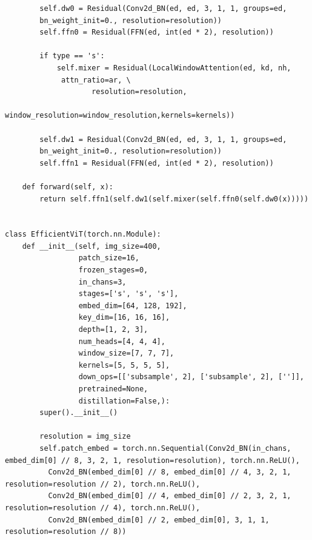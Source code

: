 \documentclass[12pt]{ctexart}
\begin{document}
\begin{lstlisting}
        self.dw0 = Residual(Conv2d_BN(ed, ed, 3, 1, 1, groups=ed, 
        bn_weight_init=0., resolution=resolution))
        self.ffn0 = Residual(FFN(ed, int(ed * 2), resolution))
 
        if type == 's':
            self.mixer = Residual(LocalWindowAttention(ed, kd, nh,
             attn_ratio=ar, \
                    resolution=resolution,
                    window_resolution=window_resolution,kernels=kernels))
                
        self.dw1 = Residual(Conv2d_BN(ed, ed, 3, 1, 1, groups=ed, 
        bn_weight_init=0., resolution=resolution))
        self.ffn1 = Residual(FFN(ed, int(ed * 2), resolution))
 
    def forward(self, x):
        return self.ffn1(self.dw1(self.mixer(self.ffn0(self.dw0(x)))))
 
 
class EfficientViT(torch.nn.Module):
    def __init__(self, img_size=400,
                 patch_size=16,
                 frozen_stages=0,
                 in_chans=3,
                 stages=['s', 's', 's'],
                 embed_dim=[64, 128, 192],
                 key_dim=[16, 16, 16],
                 depth=[1, 2, 3],
                 num_heads=[4, 4, 4],
                 window_size=[7, 7, 7],
                 kernels=[5, 5, 5, 5],
                 down_ops=[['subsample', 2], ['subsample', 2], ['']],
                 pretrained=None,
                 distillation=False,):
        super().__init__()
 
        resolution = img_size
        self.patch_embed = torch.nn.Sequential(Conv2d_BN(in_chans, embed_dim[0] // 8, 3, 2, 1, resolution=resolution), torch.nn.ReLU(),
          Conv2d_BN(embed_dim[0] // 8, embed_dim[0] // 4, 3, 2, 1, resolution=resolution // 2), torch.nn.ReLU(),
          Conv2d_BN(embed_dim[0] // 4, embed_dim[0] // 2, 3, 2, 1, resolution=resolution // 4), torch.nn.ReLU(),
          Conv2d_BN(embed_dim[0] // 2, embed_dim[0], 3, 1, 1, resolution=resolution // 8))
 

\end{lstlisting}
\end{document}
